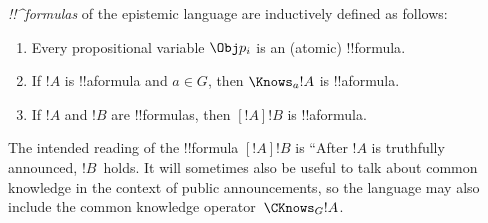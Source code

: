 \documentclass[../../../include/open-logic-section]{subfiles}
\begin{document}
\begin{defn}
  \emph{!!^{formula}s} of the epistemic language are inductively
  defined as follows:
  \begin{enumerate}


  \item Every propositional variable $\Obj p_i$ is an (atomic)
  !!{formula}.






  \item If $!A$ is !!a{formula} and $a \in G$, then $\Knows_a !A$ is
  !!a{formula}.
  
  \item If $!A$ and $!B$ are !!{formula}s, then $[!A] !B$ is !!a{formula}.

\end{enumerate}
\end{defn}

The intended reading of the !!{formula} $[!A] !B$ is ``After $!A$ is
truthfully announced, $!B$~holds. It will sometimes also be useful to
talk about common knowledge in the context of public announcements, so
the language may also include the common knowledge operator~$\CKnows_G
!A$.
\end{document}
